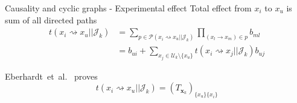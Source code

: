 \begin{frame}{Causality and cyclic graphs - Experimental effect}
Total effect from $x_i$ to $x_u$ is sum of all directed paths
\begin{subequations}
\label{eq:experimental_effect}
\begin{align}
t(x_i \rightsquigarrow x_u || \mathcal{J}_k) &= \sum_{p \in \mathcal{P}(x_i \rightsquigarrow x_u || \mathcal{J}_k)} \prod_{(x_l \rightarrow x_m) \in p} b_{ml}
\\
\label{eq:t_to_b}
&= b_{ui} + \sum_{x_j \in \mathcal{U}_k \setminus \{x_u\}} t(x_i \rightsquigarrow x_j || \mathcal{J}_k) b_{uj}
\end{align}
\end{subequations}


Eberhardt~et~al.~\cite{EberhardtLLCdetail} proves
\begin{equation}
    t(x_i \rightsquigarrow x_u || \mathcal{J}_k) = (T_{\boldsymbol{x}_k})_{\{x_u\}\{x_i\}}
\end{equation}


\end{frame}
